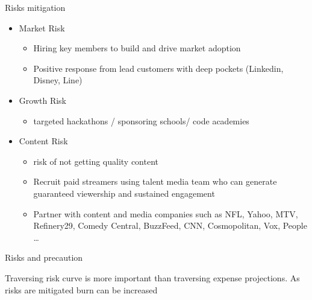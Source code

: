 \documentclass[12pt]{beamer}
\begin{document}
\begin{frame}[fragile]{Risks mitigation}
  \begin{itemize}[<+-| alert@+>]
\item[ ]Market Risk
\begin{itemize}[<+-| alert@+>]
\item  Hiring key members to build and drive market adoption
\item  Positive response from lead customers with deep pockets (Linkedin, Disney, Line) 
\end{itemize}

\item[ ]Growth Risk
\begin{itemize}[<+-| alert@+>]
\item targeted hackathons / sponsoring schools/ code academies
\end{itemize}

\item[ ]Content Risk
\begin{itemize}[<+-| alert@+>]
\item risk of not getting quality content
\item Recruit paid streamers using talent media team who can generate guaranteed viewership and sustained engagement
\item Partner with content and media companies such as NFL, Yahoo, MTV, Refinery29, Comedy Central, BuzzFeed, CNN, Cosmopolitan, Vox, People \ldots
\end{itemize}

\iffalse
\item[ ]Team People Risk
\begin{itemize}[<+-| alert@+>]
\item Frank Stanbach → ex roku, apple. expert in Android dev, live-streaming, media
\item Guillaume Pastorino  → rtmp, h264, h265 encoder, low-level programming in c, java
\item Hoot Live, inc., can proactively build a hiring hit list from Netflix, Twitch, Youtube, Facebook, Yahoo, Twitter, Cisco, Webex, Zoom, Onlive and Google
\end{itemize}
 \fi

\end{itemize}
\end{frame}
\begin{frame}[standout]
  Risks and precaution


 Traversing risk curve is more important than traversing expense projections. As risks are mitigated burn can be increased 
  
\end{frame}
\end{document}
